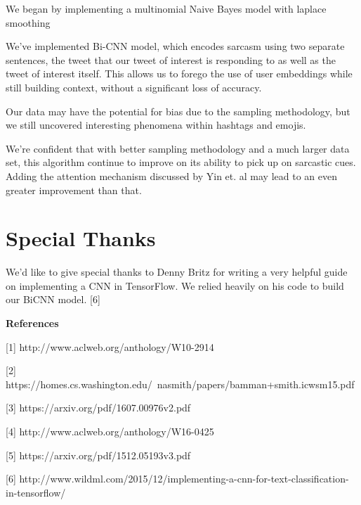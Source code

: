 \documentclass[11pt,a4paper]{article}
\begin{document}
We began by implementing a multinomial Naive Bayes model with laplace smoothing

We've implemented Bi-CNN model, which encodes sarcasm using two separate sentences, the tweet that our tweet of interest is responding to as well as the tweet of interest itself. This allows us to forego the use of user embeddings while still building context, without a significant loss of accuracy.  

Our data may have the potential for bias due to the sampling methodology, but we still uncovered interesting phenomena within hashtags and emojis.

We're confident that with better sampling methodology and a much larger data set, this algorithm continue to improve on its ability to pick up on sarcastic cues. Adding the attention mechanism discussed by Yin et. al may lead to an even greater improvement than that.

\section{Special Thanks}

We'd like to give special thanks to Denny Britz for writing a very helpful guide on implementing a CNN in TensorFlow. We relied heavily on his code to build our BiCNN model. [6]

\textbf{References}

[1] http://www.aclweb.org/anthology/W10-2914

[2] https://homes.cs.washington.edu/~nasmith/papers/bamman+smith.icwsm15.pdf

[3] https://arxiv.org/pdf/1607.00976v2.pdf

[4] http://www.aclweb.org/anthology/W16-0425

[5] https://arxiv.org/pdf/1512.05193v3.pdf

[6] http://www.wildml.com/2015/12/implementing-a-cnn-for-text-classification-in-tensorflow/
\end{document}
